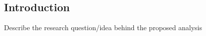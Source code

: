 \begin{multicols}{2}
\tableofcontents
\section{Introduction}
Describe the research question/idea behind the proposed analysis

\end{multicols}